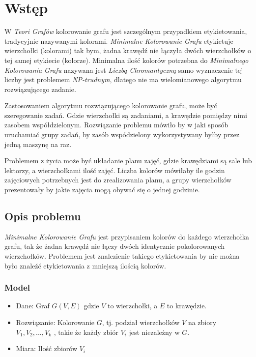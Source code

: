 \chapter{Wstęp}
\thispagestyle{chapterBeginStyle}
\label{rozdzial1}

W \textit{Teori Grafów} kolorowanie grafu jest szczególnym przypadkiem etykietowania, tradycyjnie nazywanymi kolorami. 
\textit{Minimalne Kolorowanie Grafu} etykietuje wierzchołki (kolorami) tak bym, żadna krawędź nie łączyła dwóch wierzchołków o tej samej etykiecie (kolorze).
Minimalna ilość kolorów potrzebna do \textit{Minimalnego Kolorowania Grafu} nazywana jest \textit{Liczbą Chromantyczną} samo wyznaczenie tej liczby jest problemem \textit{NP-trudnym}\cite{NP}, dlatego nie ma wielomianowego algorytmu rozwiązującego zadanie. 

Zastosowaniem algorytmu rozwiązującego kolorowanie grafu, może być szeregowanie zadań. 
Gdzie wierzchołki są zadaniami, a krawędzie pomiędzy nimi zasobem współdzielonym.
Rozwiązanie problemu mówiło by w jaki sposób uruchamiać grupy zadań,
by zasób wspódzielony wykorzystywany byłby przez jedną maszynę na raz.

Problemem z życia może być układanie planu zajęć, gdzie krawędziami są sale lub lektorzy, a wierzchołkami ilość zajęć.  
Liczba kolorów mówiłaby ile godzin zajęciowych potrzebnych jest do zrealizowania planu, a grupy wierzchołków prezentowały by jakie zajęcia mogą obywać się o jednej godzinie.


\section{Opis problemu}
\textit{Minimalne Kolorowanie Grafu} jest przypisaniem kolorów do każdego wierzchołka grafu, tak że żadna krawędź nie łączy dwóch identycznie pokolorowanych wierzchołków.
Problemem jest znalezienie takiego etykietowania by nie można było znaleźć etykietowania z mniejszą ilością kolorów.

\subsection{Model}
\begin{itemize}
    \item Dane: Graf $G(V, E)$ gdzie $V$ to wierzchołki, a $E$ to krawędzie. 
    \item Rozwiązanie: Kolorowanie $G$, tj. podział wierzchołków $V$ na zbiory $V_1, V_2, ..., V_k$  , takie że każdy zbiór $V_i$ jest niezależny w $G$.
    \item Miara: Ilość zbiorów $V_i$
\end{itemize}

